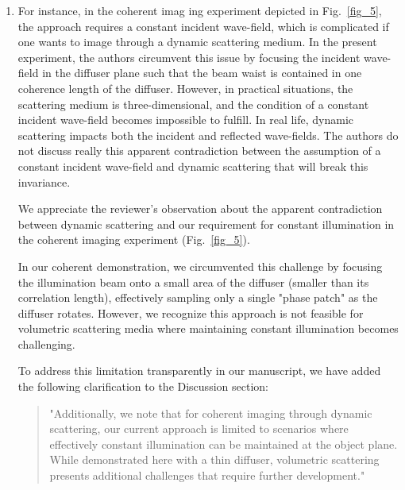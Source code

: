 \documentclass[12pt]{article}
\newenvironment{solved_reviewercomment}
    {\begin{tcolorbox}[width=\linewidth,colback=gray!5,colframe=solved_commentcolor!50,title=Reviewer Comment,left=5pt,right=5pt]}
    {\end{tcolorbox}}
\newenvironment{ourresponse}
    {\begin{tcolorbox}[width=\linewidth,breakable,enhanced,colback=gray!5,colframe=responsecolor!50,title=Response,left=5pt,right=5pt]}
    {\end{tcolorbox}}
\begin{document}
\begin{enumerate}[label=\arabic*.]

\item \leavevmode\vspace{-\baselineskip}
\begin{solved_reviewercomment}
    For instance, in the coherent imag ing experiment depicted in Fig.~\ref{fig_5}, the approach requires a constant incident wave-field, which is complicated if one wants to image through a dynamic scattering medium. In the present experiment, the authors circumvent this issue by focusing the incident wave-field in the diffuser plane such that the beam waist is contained in one coherence length of the diffuser. However, in practical situations, the scattering medium is three-dimensional, and the condition of a constant incident wave-field becomes impossible to fulfill. In real life, dynamic scattering impacts both the incident and reflected wave-fields. The authors do not discuss really this apparent contradiction between the assumption of a constant incident wave-field and dynamic scattering that will break this invariance.
\end{solved_reviewercomment}

\begin{ourresponse}
    We appreciate the reviewer's observation about the apparent contradiction between dynamic scattering and our requirement for constant illumination in the coherent imaging experiment (Fig.~\ref{fig_5}). 
    
    In our coherent demonstration, we circumvented this challenge by focusing the illumination beam onto a small area of the diffuser (smaller than its correlation length), effectively sampling only a single "phase patch" as the diffuser rotates. However, we recognize this approach is not feasible for volumetric scattering media where maintaining constant illumination becomes challenging.
    
    To address this limitation transparently in our manuscript, we have added the following clarification to the Discussion section:
    
    \begin{quote}
        "Additionally, we note that for coherent imaging through dynamic scattering, our current approach is limited to scenarios where effectively constant illumination can be maintained at the object plane. While demonstrated here with a thin diffuser, volumetric scattering presents additional challenges that require further development."
    \end{quote}
    

\end{ourresponse}
\end{enumerate}
\end{document}
